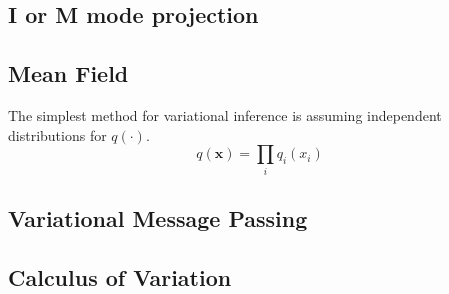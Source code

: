 \subsection{I or M mode projection}

\subsection{Mean Field}
The simplest method for variational inference is assuming independent distributions for $q(\cdot)$.
\begin{equation}
    q(\mathbf{x}) = \prod_i q_i(x_i)
\end{equation}

\subsection{Variational Message Passing}



\subsection{Calculus of Variation}